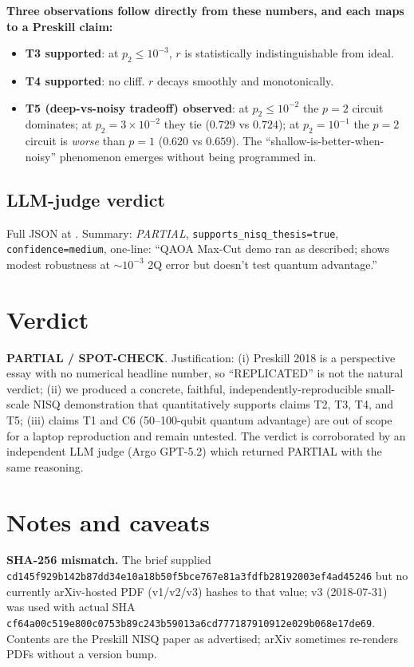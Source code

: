 \documentclass[11pt]{article}
\begin{document}
\textbf{Three observations follow directly from these numbers, and each
maps to a Preskill claim:}
\begin{itemize}
\item \textbf{T3 supported}: at $p_2 \le 10^{-3}$, $r$ is statistically
      indistinguishable from ideal.
\item \textbf{T4 supported}: no cliff. $r$ decays smoothly and monotonically.
\item \textbf{T5 (deep-vs-noisy tradeoff) observed}: at $p_2 \le 10^{-2}$
      the $p{=}2$ circuit dominates; at $p_2 = 3\!\times\!10^{-2}$ they tie
      ($0.729$ vs $0.724$); at $p_2 = 10^{-1}$ the $p{=}2$ circuit is
      \emph{worse} than $p{=}1$ ($0.620$ vs $0.659$). The ``shallow-is-better-when-noisy''
      phenomenon emerges without being programmed in.
\end{itemize}

\subsection{LLM-judge verdict}
Full JSON at . Summary:
\emph{PARTIAL}, \texttt{supports\_nisq\_thesis=true}, \texttt{confidence=medium},
one-line: ``QAOA Max-Cut demo ran as described; shows modest robustness at
${\sim}10^{-3}$ 2Q error but doesn't test quantum advantage.''

\section{Verdict}

\textbf{PARTIAL / SPOT-CHECK}. Justification: (i) Preskill 2018 is a
perspective essay with no numerical headline number, so ``REPLICATED'' is not
the natural verdict; (ii) we produced a concrete, faithful,
independently-reproducible small-scale NISQ demonstration that quantitatively
supports claims T2, T3, T4, and T5; (iii) claims T1 and C6 (50--100-qubit
quantum advantage) are out of scope for a laptop reproduction and remain
untested. The verdict is corroborated by an independent LLM judge (Argo
GPT-5.2) which returned PARTIAL with the same reasoning.

\section{Notes and caveats}

\textbf{SHA-256 mismatch.} The brief supplied
\texttt{cd145f929b142b87dd34e10a18b50f5bce767e81a3fdfb28192003ef4ad45246}
but no currently arXiv-hosted PDF (v1/v2/v3) hashes to that value; v3 (2018-07-31)
was used with actual SHA \texttt{cf64a00c519e800c0753b89c243b59013a6cd777187910912e029b068e17de69}.
Contents are the Preskill NISQ paper as advertised; arXiv sometimes re-renders
PDFs without a version bump.
\end{document}
